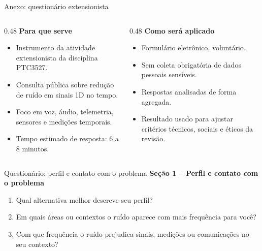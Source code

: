 \documentclass[aspectratio=1610,11pt]{beamer}
\begin{document}
{

\begin{frame}[noframenumbering]{Anexo: questionário extensionista}
    \hypertarget{fr-questionario-anexo}{}
    \begin{columns}[T,onlytextwidth]
        \begin{column}{0.48\textwidth}
            \textbf{Para que serve}
            \begin{itemize}
                \item Instrumento da atividade extensionista da disciplina PTC3527.
                \item Consulta pública sobre redução de ruído em sinais 1D no tempo.
                \item Foco em voz, áudio, telemetria, sensores e medições temporais.
                \item Tempo estimado de resposta: 6 a 8 minutos.
            \end{itemize}
        \end{column}
        \begin{column}{0.48\textwidth}
            \textbf{Como será aplicado}
            \begin{itemize}
                \item Formulário eletrônico, voluntário.
                \item Sem coleta obrigatória de dados pessoais sensíveis.
                \item Respostas analisadas de forma agregada.
                \item Resultado usado para ajustar critérios técnicos, sociais e éticos da revisão.
            \end{itemize}
        \end{column}
    \end{columns}

\end{frame}

\begin{frame}[noframenumbering]{Questionário: perfil e contato com o problema}
    \footnotesize
    \textbf{Seção 1 -- Perfil e contato com o problema}
    \begin{enumerate}
        \item Qual alternativa melhor descreve seu perfil?
        \item Em quais áreas ou contextos o ruído aparece com mais frequência para você?
        \item Com que frequência o ruído prejudica sinais, medições ou comunicações no seu contexto?
    \end{enumerate}


\end{frame}}
\end{document}
